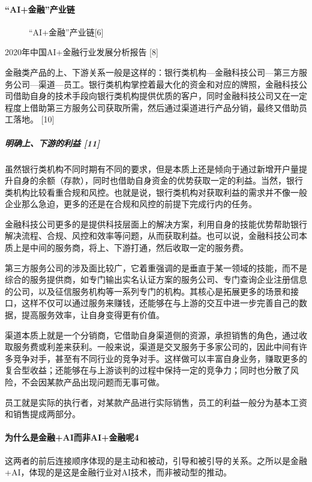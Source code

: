 \documentclass[letterpaper,11pt,english]{sphinxmanual}
\begin{document}
\paragraph{“AI+金融”产业链}
\label{\detokenize{chapter_project/AI_Finance:id5}}
\begin{figure}[H]
\centering
\capstart

\noindent{}
\caption{“AI+金融”产业链{[}6{]}}\label{\detokenize{chapter_project/AI_Finance:id32}}\end{figure}

2020年中国AI+金融行业发展分析报告 {[}8{]}

金融类产品的上、下游关系一般是这样的：银行类机构—金融科技公司—第三方服务公司—渠道—员工。银行类机构掌控着最大化的资金和对应的牌照，金融科技公司借助自身的技术手段向银行类机构提供优质的客户，同时金融科技公司又在一定程度上借助第三方服务公司获取所需，然后通过渠道进行产品分销，最终又借助员工落地。
{[}10{]}


\subparagraph{明确上、下游的利益 {[}11{]}}
\label{\detokenize{chapter_project/AI_Finance:id6}}
虽然银行类机构不同时期有不同的要求，但是本质上还是倾向于通过新增开户量提升自身的余额（存款），同时也借助自身资金的优势获取一定的利益。当然，银行类机构比较看重合规和风控。也就是说，银行类机构对获取利益的需求并不像一般企业那么急迫，更多的还是在合规和风控的前提下完成行内的任务。

金融科技公司更多的是提供科技层面上的解决方案，利用自身的技能优势帮助银行解决流程、合规、风控和效率等问题，从而获取利益。也可以说，金融科技公司本质上是中间的服务商，将上、下游打通，然后收取一定的服务费。

第三方服务公司的涉及面比较广，它着重强调的是垂直于某一领域的技能，而不是综合的服务提供商，如专门输出实名认证方案的服务公司、专门查询企业注册信息的公司，以及征信服务机构等一系列专门的机构。其核心是拓展更多的场景和接口，这样不仅可以通过服务来赚钱，还能够在与上游的交互中进一步完善自己的数据，提高服务效率，让自身变得更有价值。

渠道本质上就是一个分销商，它借助自身渠道侧的资源，承担销售的角色，通过收取服务费或利差来获利。一般来说，渠道是交叉服务于多家公司的，因此中间有许多竞争对手，甚至有不同行业的竞争对手。这样做可以丰富自身业务，赚取更多的复合型收益；还能够在与上游谈判的过程中保持一定的竞争力；同时也分散了风险，不会因某款产品出现问题而无事可做。

员工就是实际的执行者，对某款产品进行实际销售，员工的利益一般分为基本工资和销售提成两部分。


\paragraph{为什么是金融+AI而非AI+金融呢4\sphinxfootnotemark[679]}
\label{\detokenize{chapter_project/AI_Finance:aiai-4}}%
\begin{footnotetext}[679]\sphinxAtStartFootnote
{}
%
\end{footnotetext}\ignorespaces 
这两者的前后连接顺序体现的是主动和被动，引导和被引导的关系。之所以是金融+AI，体现的是这是金融行业对AI技术，而非被动型的推动。
\end{document}
